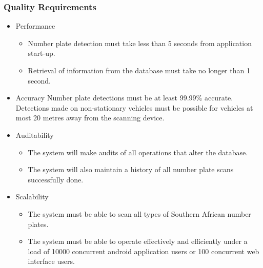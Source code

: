 \documentclass[12pt]{article}
\begin{document}
                			\subsubsection{Quality Requirements}
                					\begin{itemize}
                							\item Performance
	                								\begin{itemize}
						   			                  		\item Number plate detection must take less than 5 seconds from application start-up.
						   			                  		\item Retrieval of information from the database must take no longer than 1 second.
						   			                \end{itemize}
                								
                							\item Accuracy
			              							Number plate detections must be at least 99.99\% accurate. Detections made on non-stationary vehicles must be possible for vehicles at most 20 metres away from the scanning device.
               								
                							\item Auditability
		               								\begin{itemize}
		               									\item The system will make audits of all operations that alter the database.
		               									\item The system will also maintain a history of all number plate scans successfully done.
		               								\end{itemize}
		               								
		               								
                							\item Scalability
                									\begin{itemize}
					       				                  	\item The system must be able to scan all types of Southern African number plates.
					       				                  	\item The system must be able to operate effectively and efficiently under a load of 10000 concurrent android application users or 100 concurrent web interface users.
					       			                \end{itemize}
		               								

\end{itemize}
\end{document}
